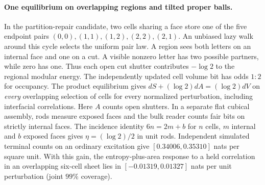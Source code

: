 \documentclass[11pt]{article}
\begin{document}
\paragraph{One equilibrium on overlapping regions and tilted proper balls.}
In the partition-repair candidate, two cells sharing a face store one
of the five endpoint pairs $(0,0),(1,1),(1,2),(2,2),(2,1)$. An unbiased
lazy walk around this cycle selects the uniform pair law. A region sees
both letters on an internal face and one on a cut. A visible nonzero
letter has two possible partners, while zero has one. Thus each open
cut shutter contributes $-\log 2$ to the regional modular energy.
The independently updated cell volume bit has odds $1:2$ for occupancy.
The product equilibrium gives $dS+(\log 2)dA=(\log 2)dV$ on \emph{every}
overlapping selection of cells for every normalized perturbation,
including interfacial correlations. Here $A$ counts open shutters.
In a separate flat cubical assembly, rods measure exposed faces and
the bulk reader counts fair bits on strictly internal faces. The
incidence identity $6n=2m+b$ for $n$ cells, $m$ internal and $b$
exposed faces gives $\eta=(\log2)/2$ in unit rods. Independent simulated
terminal counts on an ordinary excitation give $[0.34006,0.35310]$
nats per square unit. With this gain, the entropy-plus-area response
to a held correlation in an overlapping six-cell sheet lies in
$[-0.01319,0.01327]$ nats per unit perturbation (joint $99\%$ coverage).
\end{document}
